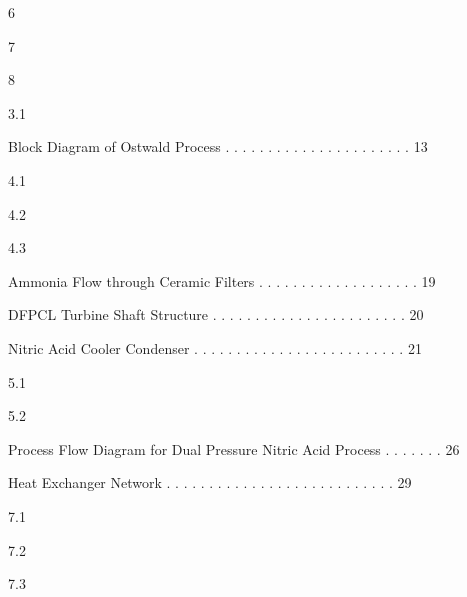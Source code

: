 \documentclass[a4paper,portrait,12pt]{article}
\begin{document}
6


7


8





3.1





\begin{flushleft}
Block Diagram of Ostwald Process . . . . . . . . . . . . . . . . . . . . . . 13
\end{flushleft}





4.1


4.2


4.3





\begin{flushleft}
Ammonia Flow through Ceramic Filters . . . . . . . . . . . . . . . . . . . 19
\end{flushleft}


\begin{flushleft}
DFPCL Turbine Shaft Structure . . . . . . . . . . . . . . . . . . . . . . . 20
\end{flushleft}


\begin{flushleft}
Nitric Acid Cooler Condenser . . . . . . . . . . . . . . . . . . . . . . . . . 21
\end{flushleft}





5.1


5.2





\begin{flushleft}
Process Flow Diagram for Dual Pressure Nitric Acid Process . . . . . . . 26
\end{flushleft}


\begin{flushleft}
Heat Exchanger Network . . . . . . . . . . . . . . . . . . . . . . . . . . . 29
\end{flushleft}





7.1


7.2


7.3
\end{document}
